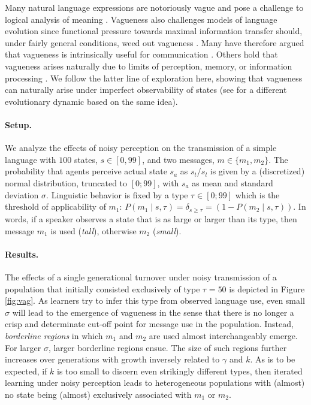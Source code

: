 \documentclass[10pt,a4paper]{article}
\newcommand{\type}[1]{\ensuremath{\tau_{#1}}}
\newcommand{\postparameter}{\ensuremath{\gamma}}
\begin{document}
Many natural language expressions are notoriously vague and pose a challenge to logical
analysis of meaning \citep[e.g.][]{Williamson1994:Vagueness}. Vagueness also challenges models
of language evolution since functional pressure towards maximal information transfer should,
under fairly general conditions, weed out vagueness \citep{Lipman2009:Why-is-Language}. Many
have therefore argued that vagueness is intrinsically useful for communication
\citep[e.g.][]{Deemter2009:Utility-and-Lan,Jaegherde-JaegherRooijvan-Rooij2010:Strategic-Vague,BlumeBoard2013:Intentional-Vag}. Others
hold that vagueness arises naturally due to limits of perception, memory, or information
processing
\citep[e.g.][]{FrankeJager2010:Vagueness-Signa,OConnor2013:The-Evolution-o,LassiterGoodman2015:Adjectival-vagu}. We
follow the latter line of exploration here, showing that vagueness can naturally arise under
imperfect observability of states (see \cite{franke+correia:toappear} for a different
evolutionary dynamic based on the same idea).

\paragraph{Setup.}  We analyze the effects of noisy perception on the transmission of a simple
language with $100$ states, $s \in [0,99]$, and two messages, $m \in \{m_1,m_2\}$. The
probability that agents perceive actual state $s_a$ as $s_t$/$s_l$ is given by a (discretized) normal
distribution, truncated to $[0;99]$, with $s_a$ as mean and standard deviation
$\sigma$. %
Linguistic behavior is fixed by a type $\type{} \in [0;99]$ which is the threshold of applicability
of $m_1$: $P(m_1 \mid s,\type{}) = \delta_{s \ge \type{}} = (1 - P(m_2 \mid s,\type{}))$. In words, if a speaker observes a
state that is as large or larger than its type, then message $m_1$ is
used (\emph{tall}), otherwise $m_2$ ({\em small}).

\paragraph{Results.} The effects of a single generational turnover under noisy transmission of a population that initially consisted exclusively of type $\type{} = 50$ is
depicted in Figure \ref{fig:vag}. As learners try to infer this type from observed language use, even small $\sigma$ will lead to
the emergence of vagueness in the sense that there is no longer a crisp and determinate cut-off
point for message use in the population. Instead, \emph{borderline regions} in which $m_1$ and $m_2$
are used almost interchangeably emerge. For larger $\sigma$, larger borderline regions ensue. The size
of such regions further increases over generations with growth inversely related to $\postparameter$
and $k$. As is to be expected, if $k$ is too small to discern even strikingly different types,
then iterated learning under noisy perception leads to heterogeneous populations with (almost)
no state being (almost) exclusively associated with $m_1$ or $m_2$.
\end{document}
